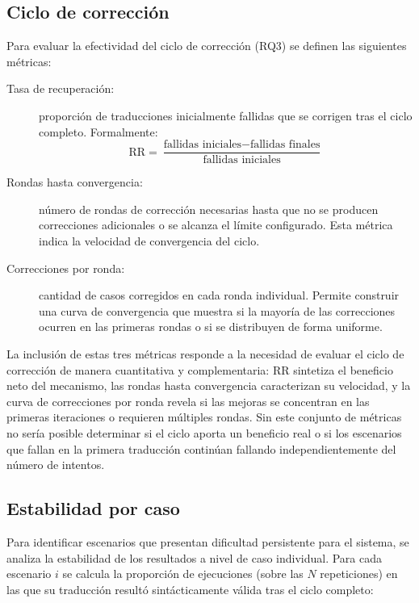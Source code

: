 \subsection{Ciclo de corrección}

Para evaluar la efectividad del ciclo de corrección (RQ3) se definen las siguientes métricas:

\begin{description}
  \item[Tasa de recuperación:] proporción de traducciones inicialmente fallidas que se corrigen tras el ciclo completo. Formalmente:
  \begin{equation}
    \text{RR} = \frac{\text{fallidas iniciales} - \text{fallidas finales}}{\text{fallidas iniciales}}
    \label{eq:rr}
  \end{equation}

  \item[Rondas hasta convergencia:] número de rondas de corrección necesarias hasta que no se producen correcciones adicionales o se alcanza el límite configurado. Esta métrica indica la velocidad de convergencia del ciclo.

  \item[Correcciones por ronda:] cantidad de casos corregidos en cada ronda individual. Permite construir una curva de convergencia que muestra si la mayoría de las correcciones ocurren en las primeras rondas o si se distribuyen de forma uniforme.
\end{description}

La inclusión de estas tres métricas responde a la necesidad de evaluar el ciclo de corrección de manera cuantitativa y complementaria: RR sintetiza el beneficio neto del mecanismo, las rondas hasta convergencia caracterizan su velocidad, y la curva de correcciones por ronda revela si las mejoras se concentran en las primeras iteraciones o requieren múltiples rondas. Sin este conjunto de métricas no sería posible determinar si el ciclo aporta un beneficio real o si los escenarios que fallan en la primera traducción continúan fallando independientemente del número de intentos.

\subsection{Estabilidad por caso}

Para identificar escenarios que presentan dificultad persistente para el sistema, se analiza la estabilidad de los resultados a nivel de caso individual. Para cada escenario $i$ se calcula la proporción de ejecuciones (sobre las $N$ repeticiones) en las que su traducción resultó sintácticamente válida tras el ciclo completo:

